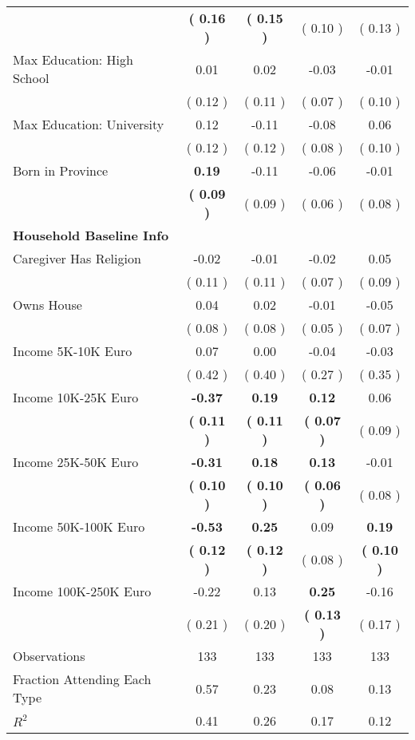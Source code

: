 \begin{table}[H]
{\begin{tabular}{lcccc}
\quad  & \textbf{(     0.16 )} & \textbf{(     0.15 )}  & (     0.10 )  & (     0.13 )  \\
\quad Max Education: High School &      0.01 &      0.02 &     -0.03 &     -0.01 \\
\quad  & (     0.12 ) & (     0.11 )  & (     0.07 )  & (     0.10 )  \\
\quad Max Education: University &      0.12 &     -0.11 &     -0.08 &      0.06 \\
\quad  & (     0.12 ) & (     0.12 )  & (     0.08 )  & (     0.10 )  \\
\quad Born in Province & \textbf{     0.19} &     -0.11 &     -0.06 &     -0.01 \\
\quad  & \textbf{(     0.09 )} & (     0.09 )  & (     0.06 )  & (     0.08 )  \\
\midrule
\textbf{Household Baseline Info} \\
\quad Caregiver Has Religion &     -0.02 &     -0.01 &     -0.02 &      0.05 \\
\quad  & (     0.11 ) & (     0.11 )  & (     0.07 )  & (     0.09 )  \\
\quad Owns House &      0.04 &      0.02 &     -0.01 &     -0.05 \\
\quad  & (     0.08 ) & (     0.08 )  & (     0.05 )  & (     0.07 )  \\
\quad Income 5K-10K Euro &      0.07 &      0.00 &     -0.04 &     -0.03 \\
\quad  & (     0.42 ) & (     0.40 )  & (     0.27 )  & (     0.35 )  \\
\quad Income 10K-25K Euro & \textbf{    -0.37} & \textbf{     0.19} & \textbf{     0.12} &      0.06 \\
\quad  & \textbf{(     0.11 )} & \textbf{(     0.11 )}  & \textbf{(     0.07 )}  & (     0.09 )  \\
\quad Income 25K-50K Euro & \textbf{    -0.31} & \textbf{     0.18} & \textbf{     0.13} &     -0.01 \\
\quad  & \textbf{(     0.10 )} & \textbf{(     0.10 )}  & \textbf{(     0.06 )}  & (     0.08 )  \\
\quad Income 50K-100K Euro & \textbf{    -0.53} & \textbf{     0.25} &      0.09 & \textbf{     0.19} \\
\quad  & \textbf{(     0.12 )} & \textbf{(     0.12 )}  & (     0.08 )  & \textbf{(     0.10 )}  \\
\quad Income 100K-250K Euro &     -0.22 &      0.13 & \textbf{     0.25} &     -0.16 \\
\quad  & (     0.21 ) & (     0.20 )  & \textbf{(     0.13 )}  & (     0.17 )  \\
\midrule
Observations & 133 & 133 & 133 & 133 \\
Fraction Attending Each Type &      0.57 &      0.23 &      0.08 &      0.13 \\
\midrule
$ R^2$ &      0.41 &      0.26 &      0.17 &      0.12 \\
\bottomrule
\end{tabular}}
\end{table}
